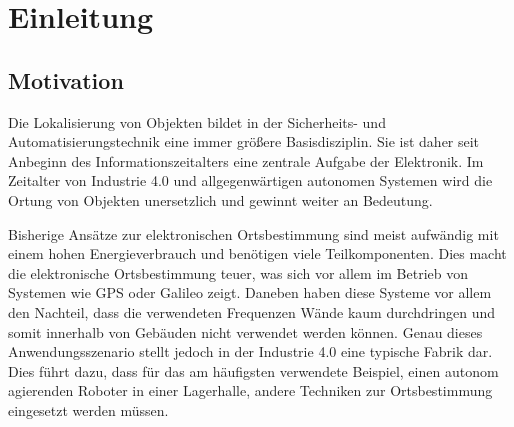
\chapter{Einleitung}
\label{sec:Einleitung}
\pagestyle{scrheadings}



\section{Motivation}
Die Lokalisierung von Objekten bildet in der Sicherheits- und Automatisierungstechnik eine immer größere Basisdisziplin. Sie ist daher seit Anbeginn des Informationszeitalters eine zentrale Aufgabe der Elektronik. Im Zeitalter von Industrie 4.0 und allgegenwärtigen autonomen Systemen wird die Ortung von Objekten unersetzlich und gewinnt weiter an Bedeutung.


Bisherige Ansätze zur elektronischen Ortsbestimmung sind meist aufwändig mit einem hohen Energieverbrauch und benötigen viele Teilkomponenten. Dies macht die elektronische Ortsbestimmung teuer, was sich vor allem im Betrieb von Systemen wie GPS oder Galileo zeigt. Daneben haben diese Systeme vor allem den Nachteil, dass die verwendeten Frequenzen Wände kaum durchdringen und somit innerhalb von Gebäuden nicht verwendet werden können. Genau dieses Anwendungsszenario stellt jedoch in der Industrie 4.0 eine typische Fabrik dar. Dies führt dazu, dass für das am häufigsten verwendete Beispiel, einen autonom agierenden Roboter in einer Lagerhalle, andere Techniken zur Ortsbestimmung eingesetzt werden müssen. 


